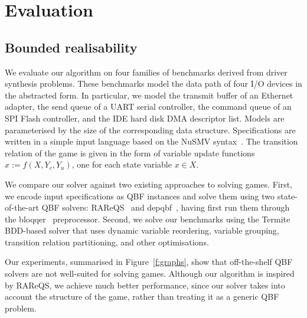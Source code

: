 \chapter{Evaluation}
\label{ch:evaluation}

\newcommand{\eva}[0]{EvaSolver}

\section{Bounded realisability}

We evaluate our algorithm on four families of benchmarks derived 
from driver synthesis problems.  These benchmarks model the data 
path of four I/O devices in the abstracted form.  In particular, 
we model the transmit buffer of an Ethernet adapter, the send 
queue of a UART serial controller, the command queue of an SPI 
Flash controller, and the IDE hard disk DMA descriptor list.   
Models are parameterised by the size of the 
corresponding data structure.  {Specifications are written in a simple input language 
based on the NuSMV syntax~\cite{nusmv}.   The 
transition relation of the game is given in the form of variable 
update functions $x :=f(X,Y_c,Y_u)$, one for each state variable 
$x\in X$.}

We compare our solver against two existing approaches to solving 
games.  First, we encode input specifications as QBF instances and 
solve them using two state-of-the-art QBF solvers: 
RAReQS~\cite{Janota_KM_12} and depqbf~\cite{Lonsing_Biere_10}, 
having first run them through the bloqqer~\cite{Biere_LS_11} 
preprocessor.  Second, we solve our benchmarks using the 
Termite~\cite{cav260} BDD-based solver that uses dynamic variable 
reordering, variable grouping, transition relation partitioning, 
and other optimisations. 

Our experiments, summarised in Figure~\ref{f:graphs}, show that 
off-the-shelf QBF solvers are not well-suited for solving games.  
Although our algorithm is inspired by RAReQS, we achieve much 
better performance, since our solver takes into account the 
structure of the game, rather than treating it as a generic QBF 
problem.  

